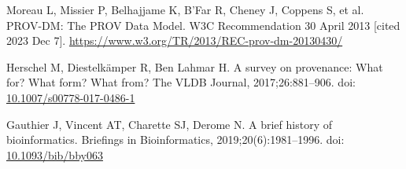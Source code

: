 \documentclass[10pt,letterpaper]{article}
\begin{document}
%
%
% 
\begin{thebibliography}{10}

\setlength{\parskip}{6pt}
\setlength{\itemsep}{0pt plus 0.3ex}


\begin{small}










Moreau L, Missier P, Belhajjame K, B'Far R, Cheney J, Coppens S, et al.
PROV-DM: The PROV Data Model. W3C Recommendation 30 April 2013 [cited 2023 Dec 7].
\url{https://www.w3.org/TR/2013/REC-prov-dm-20130430/}

Herschel M, Diestelkämper R, Ben Lahmar H.
A survey on provenance: What for? What form? What from?
The VLDB Journal, 2017;26:881--906.
doi: \href{https://doi.org/10.1007/s00778-017-0486-1}{10.1007/s00778-017-0486-1}

Gauthier J, Vincent AT, Charette SJ, Derome N.
A brief history of bioinformatics.
Briefings in Bioinformatics, 2019;20(6):1981--1996.
doi: \href{https://doi.org/10.1093/bib/bby063}{10.1093/bib/bby063}


\end{small}
\end{thebibliography}
\end{document}
